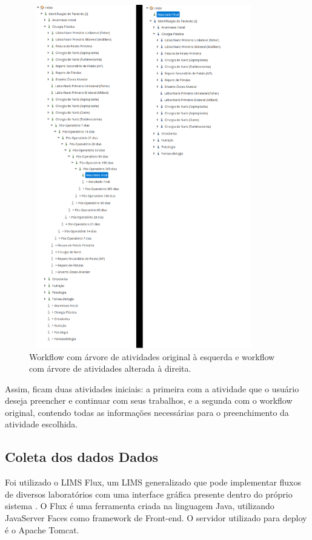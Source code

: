 \begin{figure}
    \centering
    \includegraphics[width=10cm,height=15cm]{imgs/CENTRARE/arvoreNormalEAlterada.png}
    \caption{Workflow com árvore de atividades original à esquerda e workflow com árvore de atividades alterada à direita.}
    \label{fig:realWorkflow}
\end{figure}

Assim, ficam duas atividades iniciais: a primeira com a atividade que o usuário deseja preencher e continuar com seus trabalhos, e a segunda com o workflow original, contendo todas as informações necessárias para o preenchimento da atividade escolhida.

\subsection{Coleta dos dados Dados}

Foi utilizado o LIMS Flux, um LIMS generalizado que pode implementar fluxos de diversos laboratórios com uma interface gráfica presente dentro do próprio sistema \cite{Melo2010}. O Flux é uma ferramenta criada na linguagem Java, utilizando JavaServer Faces como framework de Front-end. O servidor utilizado para deploy é o Apache Tomcat.

